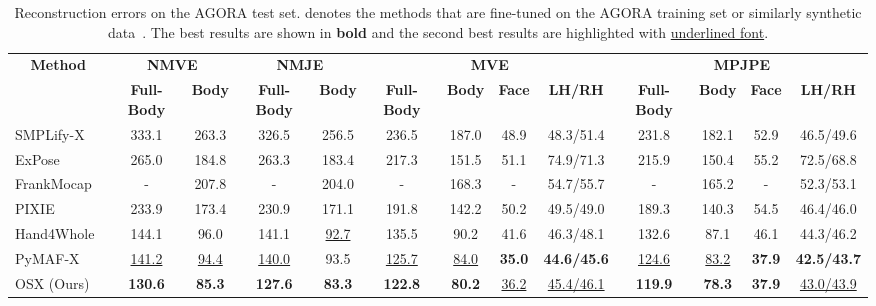 \documentclass[10pt,twocolumn,letterpaper]{article}
\begin{document}
\begin{table*}[h]
  \centering
  \resizebox{\textwidth}{!}
{
    \begin{tabular}{l|cc|cc|cccc|cccc}
    \toprule
    \multicolumn{1}{c|}{\multirow{2}[4]{*}{\textbf{Method}}}  & \multicolumn{2}{c|}{\boldmath{}\textbf{NMVE }} & 
    \multicolumn{2}{c|}{\boldmath{}\textbf{NMJE }} & 
    \multicolumn{4}{c|}{\boldmath{}\textbf{MVE }\unboldmath{}} & \multicolumn{4}{c}{\boldmath{}\textbf{MPJPE }\unboldmath{}} \\
    \cmidrule{2-13} & \textbf{Full-Body} & \textbf{Body} & \textbf{Full-Body} & \textbf{Body} &
    \textbf{Full-Body} & \textbf{Body} & \textbf{Face} & \textbf{LH/RH} & \textbf{Full-Body} & \textbf{Body} & \textbf{Face} & \textbf{LH/RH} \\
    \midrule
    SMPLify-X~\cite{Pavlakos_2019smplx} & 333.1  & 263.3 & 326.5 & 256.5 & 236.5 &187.0 & 48.9  & 48.3/51.4 & 231.8 & 182.1 & 52.9  & 46.5/49.6 \\
    ExPose~\cite{PavlakosGeorgios2020expose} & 265.0 & 184.8 &263.3 & 183.4  & 217.3 & 151.5 & 51.1  & 74.9/71.3 & 215.9 & 150.4 & 55.2  & 72.5/68.8 \\
    FrankMocap~\cite{Rong_2021frank} & - & 207.8 & - & 204.0  & - & 168.3 & -     & 54.7/55.7 & -     & 165.2 & -     & 52.3/53.1 \\
    PIXIE~\cite{Feng_2021_pixie} &  233.9 & 173.4 & 230.9 & 171.1  & 191.8 & 142.2 & 50.2  & 49.5/49.0 & 189.3 & 140.3 & 54.5  & 46.4/46.0 \\
    Hand4Whole~\cite{GyeongsikMoon2020hand4whole}  & 144.1 & 96.0 & 141.1 & \underline{92.7} & 135.5 & 90.2  & 41.6  & 46.3/48.1 & 132.6 & 87.1  & 46.1  & 44.3/46.2 \\
    PyMAF-X~\cite{HongwenZhang2022PyMAFXTW}  & \underline{141.2} & \underline{94.4} & \underline{140.0} & 93.5 & \underline{125.7} & \underline{84.0} & \textbf{35.0} & \textbf{44.6/45.6} & \underline{124.6} & \underline{83.2} & \textbf{37.9} & \textbf{42.5/43.7} \\
    \midrule
    OSX (Ours)  & \textbf{130.6}{\color{Red}} & \textbf{85.3}{\color{Red}} & \textbf{127.6}{\color{Red}} & \textbf{83.3}{\color{Red}} & \textbf{122.8} & \textbf{80.2} & \underline{36.2} & \underline{45.4/46.1} & \textbf{119.9} & \textbf{78.3} & \textbf{37.9} & \underline{43.0/43.9}  \\
    \bottomrule
    \end{tabular}}
  \caption[Reconstruction errors on the AGORA val set.]{Reconstruction errors on the AGORA test set.  denotes the methods that are fine-tuned on the AGORA training set or similarly synthetic data~\cite{kocabas2021spec}. The best results are shown in \textbf{bold} and the second best results are highlighted with \underline{underlined font}.}
  \label{tab:agora_test}\end{table*}
\end{document}
